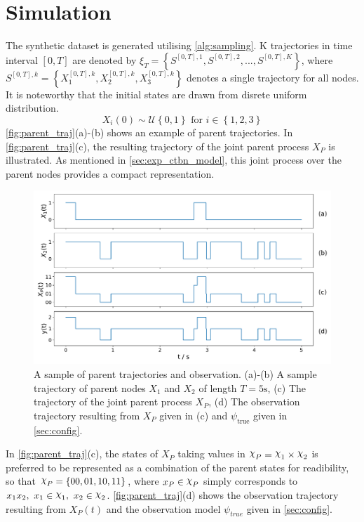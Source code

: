 \section{Simulation}
\label{sec:simulation}
The synthetic dataset is generated utilising \cref{alg:sampling}. K trajectories in time interval $ [0, T] $ are denoted by $ \xi_T = \left\lbrace S^{[0,T], 1}, S^{[0,T], 2}, ..., S^{[0,T], K} \right\rbrace  $, where $ S^{[0,T],k} = \left\lbrace X_1^{[0,T],k} , X_2^{[0,T],k}, X_3^{[0,T],k}\right\rbrace $ denotes a single trajectory for all nodes. It is noteworthy that the initial states are drawn from disrete uniform distribution.
\begin{equation}
X_i(0) \sim \mathcal{U} \left\lbrace 0, 1\right\rbrace  \text{ for } i \in \left\lbrace 1,2,3\right\rbrace 
\end{equation}
\autoref{fig:parent_traj}(a)-(b) shows an example of parent trajectories. In \autoref{fig:parent_traj}(c), the resulting trajectory of the joint parent process $ X_P $ is illustrated. As mentioned in \cref{sec:exp_ctbn_model}, this joint process over the parent nodes provides a compact representation. 
\begin{figure}[H]
	\begin{center}
		\includegraphics[width=.90\textwidth]{figures/sim_example/parent_traj}
		\caption[Parent trajectories and observation]{A sample of parent trajectories and observation. (a)-(b) A sample trajectory of parent nodes $ X_1 $ and $ X_2 $ of length $ T=5\text{s} $, (c) The trajectory of the joint parent process $ X_P $, (d) The observation trajectory resulting from $ X_P $ given in (c) and $ \psi_{\text{true}} $ given in \cref{sec:config}.}
		\label{fig:parent_traj}
	\end{center}
\end{figure}
In \autoref{fig:parent_traj}(c), the states of $ X_P $ taking values in $ \rchi_P = \rchi_1 \times \rchi_2 $ is preferred to be represented as a combination of the parent states for readibility, so that $ \rchi_P = \left\lbrace 00, 01, 10, 11\right\rbrace  $, where $ x_P \in \rchi_P $ simply corresponds to $ x_1x_2,\ x_1\in \rchi_1,\  x_2\in \rchi_2 $. \autoref{fig:parent_traj}(d) shows the observation trajectory resulting from $ X_P(t) $ and the observation model $ \psi_{true} $ given in \cref{sec:config}. \\
